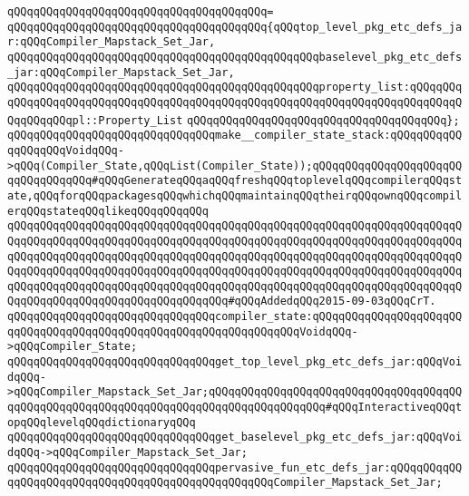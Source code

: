 \verb|qQQqqQQqqQQqqQQqqQQqqQQqqQQqqQQqqQQqqQQq=|\newline
\verb|qQQqqQQqqQQqqQQqqQQqqQQqqQQqqQQqqQQqqQQq{qQQqtop_level_pkg_etc_defs_jar:qQQqCompiler_Mapstack_Set_Jar,|\newline
\verb|qQQqqQQqqQQqqQQqqQQqqQQqqQQqqQQqqQQqqQQqqQQqqQQqbaselevel_pkg_etc_defs_jar:qQQqCompiler_Mapstack_Set_Jar,|\newline
\verb|qQQqqQQqqQQqqQQqqQQqqQQqqQQqqQQqqQQqqQQqqQQqqQQqproperty_list:qQQqqQQqqQQqqQQqqQQqqQQqqQQqqQQqqQQqqQQqqQQqqQQqqQQqqQQqqQQqqQQqqQQqqQQqqQQqqQQqqQQqqQQqpl::Property_List|\newline
\verb|qQQqqQQqqQQqqQQqqQQqqQQqqQQqqQQqqQQqqQQq};|\newline
\newline
\verb|qQQqqQQqqQQqqQQqqQQqqQQqqQQqqQQqmake__compiler_state_stack:qQQqqQQqqQQqqQQqqQQqVoidqQQq->qQQq(Compiler_State,qQQqList(Compiler_State));qQQqqQQqqQQqqQQqqQQqqQQqqQQqqQQqqQQq#qQQqGenerateqQQqaqQQqfreshqQQqtoplevelqQQqcompilerqQQqstate,qQQqforqQQqpackagesqQQqwhichqQQqmaintainqQQqtheirqQQqownqQQqcompilerqQQqstateqQQqlikeqQQqqQQqqQQq|\newline
\verb|qQQqqQQqqQQqqQQqqQQqqQQqqQQqqQQqqQQqqQQqqQQqqQQqqQQqqQQqqQQqqQQqqQQqqQQqqQQqqQQqqQQqqQQqqQQqqQQqqQQqqQQqqQQqqQQqqQQqqQQqqQQqqQQqqQQqqQQqqQQqqQQqqQQqqQQqqQQqqQQqqQQqqQQqqQQqqQQqqQQqqQQqqQQqqQQqqQQqqQQqqQQqqQQqqQQqqQQqqQQqqQQqqQQqqQQqqQQqqQQqqQQqqQQqqQQqqQQqqQQqqQQqqQQqqQQqqQQqqQQqqQQqqQQqqQQqqQQqqQQqqQQqqQQqqQQqqQQqqQQqqQQqqQQqqQQqqQQqqQQqqQQqqQQqqQQqqQQqqQQqqQQqqQQqqQQqqQQqqQQqqQQq#qQQqAddedqQQq2015-09-03qQQqCrT.|\newline
\verb|qQQqqQQqqQQqqQQqqQQqqQQqqQQqqQQqcompiler_state:qQQqqQQqqQQqqQQqqQQqqQQqqQQqqQQqqQQqqQQqqQQqqQQqqQQqqQQqqQQqqQQqqQQqVoidqQQq->qQQqCompiler_State;|\newline
\newline
\verb|qQQqqQQqqQQqqQQqqQQqqQQqqQQqqQQqget_top_level_pkg_etc_defs_jar:qQQqVoidqQQq->qQQqCompiler_Mapstack_Set_Jar;qQQqqQQqqQQqqQQqqQQqqQQqqQQqqQQqqQQqqQQqqQQqqQQqqQQqqQQqqQQqqQQqqQQqqQQqqQQqqQQqqQQqqQQq#qQQqInteractiveqQQqtopqQQqlevelqQQqdictionaryqQQq|\newline
\verb|qQQqqQQqqQQqqQQqqQQqqQQqqQQqqQQqget_baselevel_pkg_etc_defs_jar:qQQqVoidqQQq->qQQqCompiler_Mapstack_Set_Jar;|\newline
\verb|qQQqqQQqqQQqqQQqqQQqqQQqqQQqqQQqpervasive_fun_etc_defs_jar:qQQqqQQqqQQqqQQqqQQqqQQqqQQqqQQqqQQqqQQqqQQqqQQqqQQqCompiler_Mapstack_Set_Jar;|\newline
